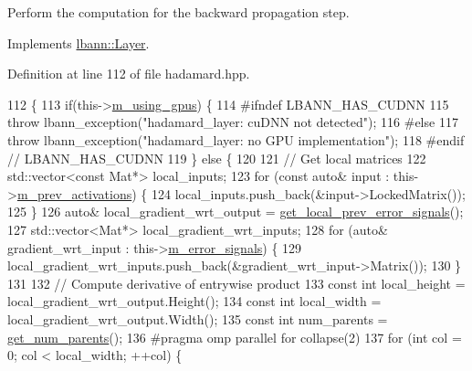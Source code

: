 Perform the computation for the backward propagation step. 

Implements \hyperlink{classlbann_1_1Layer_a7442e01f9ee1294df2de811efcf5171e}{lbann\+::\+Layer}.



Definition at line 112 of file hadamard.\+hpp.


\begin{DoxyCode}
112                              \{
113     \textcolor{keywordflow}{if}(this->\hyperlink{classlbann_1_1Layer_af7881cb5eff5207c15fa835d65462e8f}{m\_using\_gpus}) \{
114 \textcolor{preprocessor}{  #ifndef LBANN\_HAS\_CUDNN}
115       \textcolor{keywordflow}{throw} lbann\_exception(\textcolor{stringliteral}{"hadamard\_layer: cuDNN not detected"});
116 \textcolor{preprocessor}{  #else}
117       \textcolor{keywordflow}{throw} lbann\_exception(\textcolor{stringliteral}{"hadamard\_layer: no GPU implementation"});
118 \textcolor{preprocessor}{  #endif // LBANN\_HAS\_CUDNN}
119     \} \textcolor{keywordflow}{else} \{
120 
121       \textcolor{comment}{// Get local matrices}
122       std::vector<const Mat*> local\_inputs;
123       \textcolor{keywordflow}{for} (\textcolor{keyword}{const} \textcolor{keyword}{auto}& input : this->\hyperlink{classlbann_1_1Layer_a52314601c3458268f56e017dc2ade357}{m\_prev\_activations}) \{
124         local\_inputs.push\_back(&input->LockedMatrix());
125       \}
126       \textcolor{keyword}{auto}& local\_gradient\_wrt\_output = \hyperlink{classlbann_1_1Layer_a82827edc5e869960144f3ccb2172bfcd}{get\_local\_prev\_error\_signals}();
127       std::vector<Mat*> local\_gradient\_wrt\_inputs;
128       \textcolor{keywordflow}{for} (\textcolor{keyword}{auto}& gradient\_wrt\_input : this->\hyperlink{classlbann_1_1Layer_a452e22ac81c1a799f0614b3e942ea726}{m\_error\_signals}) \{
129         local\_gradient\_wrt\_inputs.push\_back(&gradient\_wrt\_input->Matrix());
130       \}
131 
132       \textcolor{comment}{// Compute derivative of entrywise product}
133       \textcolor{keyword}{const} \textcolor{keywordtype}{int} local\_height = local\_gradient\_wrt\_output.Height();
134       \textcolor{keyword}{const} \textcolor{keywordtype}{int} local\_width = local\_gradient\_wrt\_output.Width();
135       \textcolor{keyword}{const} \textcolor{keywordtype}{int} num\_parents = \hyperlink{classlbann_1_1Layer_ac9290d4a6453ccda5f6b4d8b57b49ba3}{get\_num\_parents}();
136 \textcolor{preprocessor}{      #pragma omp parallel for collapse(2)}
137       \textcolor{keywordflow}{for} (\textcolor{keywordtype}{int} col = 0; col < local\_width; ++col) \{

\end{DoxyCode}
